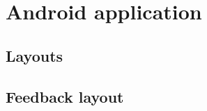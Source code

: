 \section{Android application}
\label{sec:android_app}

\subsection{Layouts}
\label{ssec:layouts}

\subsection{Feedback layout}
\label{ssec:feedback_layout}

